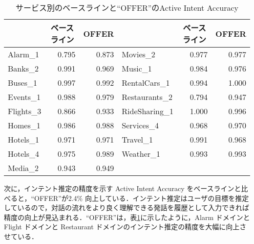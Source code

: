 \begin{table}[thb]
    \centering
    \caption{サービス別のベースラインと“OFFER”のActive Intent Accuracy}
    \label{tab:service_hikaku}
    \begin{tabular}{|l|r|r||l|r|r|} \hline
        & \multicolumn{1}{c|}{ベースライン} & \multicolumn{1}{c||}{OFFER} & &\multicolumn{1}{c|}{ベースライン} & \multicolumn{1}{c|}{OFFER} \\ \hline
        Alarm\_1 & 0.795 & 0.873 & Movies\_2 & 0.977 & 0.977 \\ \hline
        Banks\_2 & 0.991 & 0.969 & Music\_1 & 0.984 & 0.976 \\ \hline
        Buses\_1 & 0.997 & 0.992 & RentalCars\_1 & 0.994 & 1.000 \\ \hline
        Events\_1 & 0.988 & 0.979 & Restaurants\_2 & 0.794 & 0.947 \\ \hline
        Flights\_3 & 0.866 & 0.933 & RideSharing\_1 & 1.000 & 0.996 \\ \hline
        Homes\_1 & 0.986 & 0.988 & Services\_4 & 0.968 & 0.970 \\ \hline
        Hotels\_1 & 0.971 & 0.971 & Travel\_1 & 0.991 & 0.968 \\ \hline
        Hotels\_4 & 0.975 & 0.989 & Weather\_1 & 0.993 & 0.993 \\ \hline
        Media\_2 & 0.943 & 0.949 & & & \\ \hline 
    \end{tabular}
\end{table}

次に，インテント推定の精度を示す Active Intent Accuracy をベースラインと比べると，“OFFER”が2.4\% 向上している．インテント推定はユーザの目標を推定しているので，対話の流れをより良く理解できる発話を履歴として入力できれば精度の向上が見込まれる．“OFFER”は，表\ref{tab:service_hikaku}に示したように，Alarm ドメインと Flight ドメインと Restaurant ドメインのインテント推定の精度を大幅に向上させている．




